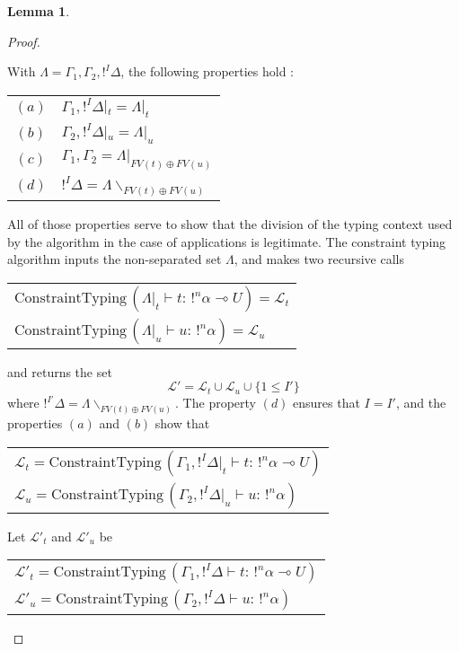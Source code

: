\documentclass[10pt]{article}
\theoremstyle{plain}
\theoremstyle{definition}
\newtheorem{lemma}{Lemma}[section]
\begin{document}
\begin{lemma}
\begin{proof}
\begin{itemize}
				With $\Lambda = \Gamma_1, \Gamma_2, !^I \Delta$, the following properties hold :
					\begin{center}
					\begin{tabular}{cl}
						$(a)$ & $ \Gamma_1, !^I\Delta|_t = \Lambda |_t $ \\
						$(b)$ & $ \Gamma_2, !^I\Delta|_u = \Lambda |_u $	\\
						$(c)$ & $ \Gamma_1, \Gamma_2 = \Lambda |_{FV(t) \oplus FV(u)} $ \\
						$(d)$ & $ !^I \Delta = \Lambda \backslash_{FV(t) \oplus FV(u)} $
					\end{tabular}
					\end{center}
			 	All of those properties serve to show that the division of the typing context used by the algorithm in the case of applications
			 	is legitimate. The constraint typing algorithm inputs the non-separated set $\Lambda$, and makes two recursive calls
			 		\begin{center}
			 		\begin{tabular}{l}
			 			$\text{ConstraintTyping} \, (\Lambda |_t \vdash t : \, !^n\alpha \multimap U) = \mathcal{L}_t$ \\
			 			$\text{ConstraintTyping} \, (\Lambda |_u \vdash u : \, !^n\alpha) = \mathcal{L}_u$
			 		\end{tabular}
			 		\end{center}
			 	and returns the set
			 		$$ \mathcal{L'} = \mathcal{L}_t \cup \mathcal{L}_u \cup \{ 1 \le I' \} $$
			 	where $!^{I'} \Delta = \Lambda \backslash_{FV(t) \oplus FV(u)}$.
			 	The property $(d)$ ensures that $I = I'$, and the properties $(a)$ and $(b)$ show that
			 		\begin{center}
			 		\begin{tabular}{l}
			 			$\mathcal{L}_t = \text{ConstraintTyping} \, (\Gamma_1, !^I \Delta |_t \vdash t : \, !^n\alpha \multimap U)$ \\
			 			$\mathcal{L}_u = \text{ConstraintTyping} \, (\Gamma_2, !^I \Delta |_u \vdash u : \, !^n\alpha)$
			 		\end{tabular}
			 		\end{center}
			 	Let $\mathcal{L'}_t$ and $\mathcal{L'}_u$ be
			 		\begin{center}
			 		\begin{tabular}{l}
			 			$\mathcal{L'}_t = \text{ConstraintTyping} \, (\Gamma_1, !^I \Delta \vdash t : \, !^n\alpha \multimap U)$ \\
			 			$\mathcal{L'}_u = \text{ConstraintTyping} \, (\Gamma_2, !^I \Delta \vdash u : \, !^n\alpha)$

\end{tabular}
\end{center}
\end{itemize}
\end{proof}
\end{lemma}
\end{document}
